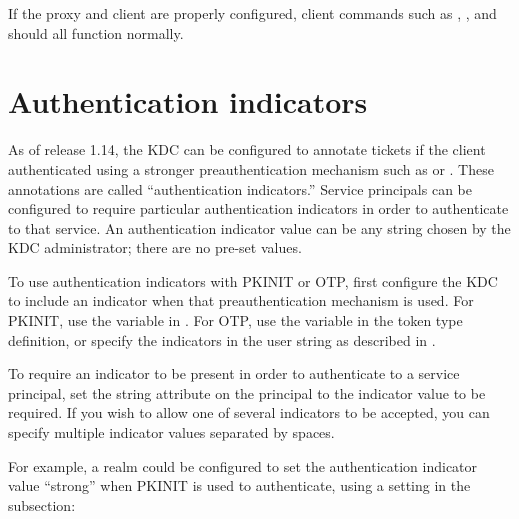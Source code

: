 \documentclass[letterpaper,10pt,english]{sphinxmanual}
\begin{document}
If the proxy and client are properly configured, client commands such
as , , and  should all function normally.


\chapter{Authentication indicators}
\label{\detokenize{admin/auth_indicator:auth-indicator}}\label{\detokenize{admin/auth_indicator:authentication-indicators}}\label{\detokenize{admin/auth_indicator::doc}}
As of release 1.14, the KDC can be configured to annotate tickets if
the client authenticated using a stronger preauthentication mechanism
such as {\hyperref[\detokenize{admin/pkinit:pkinit}]{}} or {\hyperref[\detokenize{admin/otp:otp-preauth}]{}}.  These
annotations are called “authentication indicators.”  Service
principals can be configured to require particular authentication
indicators in order to authenticate to that service.  An
authentication indicator value can be any string chosen by the KDC
administrator; there are no pre-set values.

To use authentication indicators with PKINIT or OTP, first configure
the KDC to include an indicator when that preauthentication mechanism
is used.  For PKINIT, use the  variable in
{\hyperref[\detokenize{admin/conf_files/kdc_conf:kdc-conf-5}]{}}.  For OTP, use the  variable in the
token type definition, or specify the indicators in the  user
string as described in {\hyperref[\detokenize{admin/otp:otp-preauth}]{}}.

To require an indicator to be present in order to authenticate to a
service principal, set the  string attribute on the
principal to the indicator value to be required.  If you wish to allow
one of several indicators to be accepted, you can specify multiple
indicator values separated by spaces.

For example, a realm could be configured to set the authentication
indicator value “strong” when PKINIT is used to authenticate, using a
setting in the {\hyperref[\detokenize{admin/conf_files/kdc_conf:kdc-realms}]{}} subsection:
\end{document}
